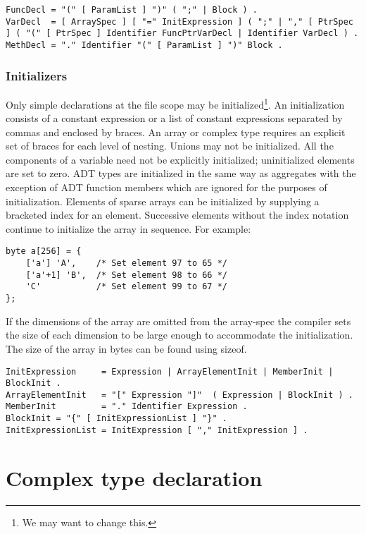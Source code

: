 \begin{lstlisting}
FuncDecl = "(" [ ParamList ] ")" ( ";" | Block ) .
VarDecl  = [ ArraySpec ] [ "=" InitExpression ] ( ";" | "," [ PtrSpec ] ( "(" [ PtrSpec ] Identifier FuncPtrVarDecl | Identifier VarDecl ) .
MethDecl = "." Identifier "(" [ ParamList ] ")" Block .
\end{lstlisting}

\hypertarget{initializers}{%
\subsubsection{Initializers}\label{initializers}}
Only simple declarations at the file scope may be initialized\footnote{We may want to change this.}. 
An initialization consists of a constant expression or a list of
constant expressions separated by commas and enclosed by braces. An
array or complex type requires an explicit set of braces for each level
of nesting. Unions may not be initialized. All the components of a
variable need not be explicitly initialized; uninitialized elements are
set to zero. ADT types are initialized in the same way as aggregates
with the exception of ADT function members which are ignored for the
purposes of initialization. Elements of sparse arrays can be initialized
by supplying a bracketed index for an element. Successive elements
without the index notation continue to initialize the array in sequence.
For example:

\begin{lstlisting}
byte a[256] = {
    ['a'] 'A',    /* Set element 97 to 65 */
    ['a'+1] 'B',  /* Set element 98 to 66 */
    'C'           /* Set element 99 to 67 */
};
\end{lstlisting}

If the dimensions of the array are omitted from the array-spec the
compiler sets the size of each dimension to be large enough to
accommodate the initialization. The size of the array in bytes can be
found using sizeof.

\begin{lstlisting}
InitExpression     = Expression | ArrayElementInit | MemberInit | BlockInit .
ArrayElementInit   = "[" Expression "]"  ( Expression | BlockInit ) .
MemberInit         = "." Identifier Expression .
BlockInit = "{" [ InitExpressionList ] "}" .
InitExpressionList = InitExpression [ "," InitExpression ] .
\end{lstlisting}

\hypertarget{complex-type-declaration}{%
\section{Complex type declaration}\label{complex-type-declaration}}

